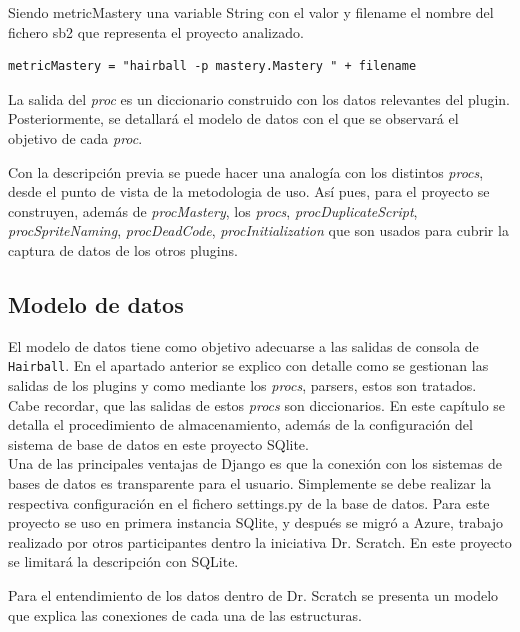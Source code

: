 \documentclass[a4paper, 12pt]{book}
\begin{document}
Siendo metricMastery una variable String con el valor y filename el nombre del fichero
sb2 que representa el proyecto analizado. \\

\begingroup
\fontsize{7pt}{8pt}\selectfont
\begin{verbatim}
metricMastery = "hairball -p mastery.Mastery " + filename
\end{verbatim}
\endgroup

La salida del \emph{proc} es un diccionario construido con los datos relevantes del 
plugin. Posteriormente, se detallará el modelo de datos con el que se observará el
objetivo de cada \emph{proc}.

Con la descripción previa se puede hacer una analogía con los distintos \emph{procs}, desde
el punto de vista de la metodologia de uso. Así pues, para el proyecto se construyen, 
además de \emph{procMastery}, los \emph{procs}, \emph{procDuplicateScript}, 
\emph{procSpriteNaming}, \emph{procDeadCode}, \emph{procInitialization} que son usados
para cubrir la captura de datos de los otros plugins.


\subsection{Modelo de datos}
El modelo de datos tiene como objetivo adecuarse a las salidas de consola de \texttt{Hairball}.
En el apartado anterior se explico con detalle como se gestionan las salidas de los
plugins y como mediante los \emph{procs}, parsers, estos son tratados. Cabe recordar,
que las salidas de estos \emph{procs} son diccionarios. En este capítulo se detalla
el procedimiento de almacenamiento, además de la configuración del sistema de base
de datos en este proyecto SQlite. \\

Una de las principales ventajas de Django es que la conexión con los sistemas de bases
de datos es transparente para el usuario. Simplemente se debe realizar la respectiva 
configuración en el fichero settings.py de la base de datos. Para este proyecto se uso
en primera instancia SQlite, y después se migró a Azure, trabajo realizado por otros 
participantes dentro la iniciativa Dr. Scratch. En este proyecto se limitará la 
descripción con SQLite.

Para el entendimiento de los datos dentro de Dr. Scratch se presenta un modelo que 
explica las conexiones de cada una de las estructuras.
\end{document}
